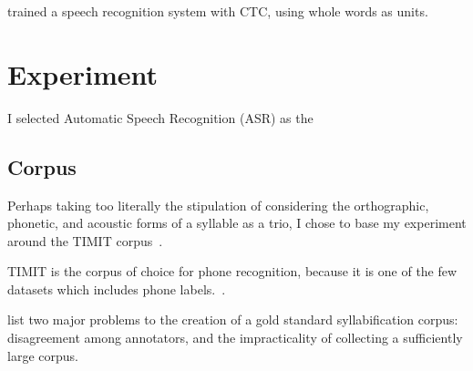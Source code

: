 \documentclass{article}[11pt]
\begin{document}
\citet{soltau_neural_2017} trained a speech recognition system with CTC, using whole words as units.

\section{Experiment}
\label{sect:experiment}

I selected Automatic Speech Recognition (ASR) as the 

\subsection{Corpus}

Perhaps taking too literally the stipulation of considering the orthographic, phonetic, and acoustic forms of a syllable as a trio, I chose to base my experiment around the TIMIT corpus~\citep{garofolo_john_s_timit_nodate}.

TIMIT is the corpus of choice for phone recognition, because it is one of the few datasets which includes phone labels.~\citep{lopes_phoneme_2011}. 

\citet{marchand_automatic_2009} list two major problems to the creation of a gold standard syllabification corpus: disagreement among annotators, and the impracticality of collecting a sufficiently large corpus. 

\citet{baayen_r_h_celex2_1995}



%
\end{document}
